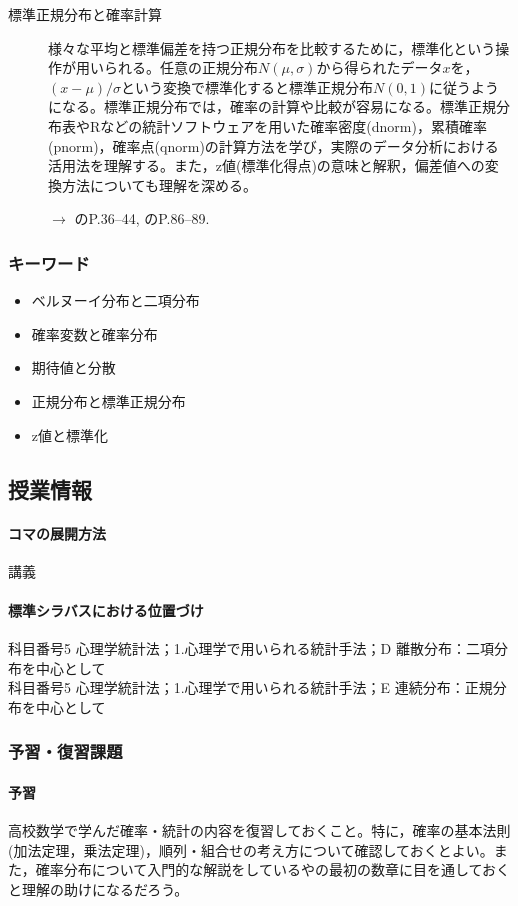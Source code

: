 \begin{description}
	\item[標準正規分布と確率計算] 様々な平均と標準偏差を持つ正規分布を比較するために，標準化という操作が用いられる。任意の正規分布$N(\mu,\sigma)$から得られたデータ$x$を，$(x-\mu)/\sigma$という変換で標準化すると標準正規分布$N(0,1)$に従うようになる。標準正規分布では，確率の計算や比較が容易になる。標準正規分布表やRなどの統計ソフトウェアを用いた確率密度(dnorm)，累積確率(pnorm)，確率点(qnorm)の計算方法を学び，実際のデータ分析における活用法を理解する。また，z値(標準化得点)の意味と解釈，偏差値への変換方法についても理解を深める。
	      \begin{flushright}
		      $\to$ \textcite{Kawabata201408}のP.36--44, \textcite{Yamada2004}のP.86--89.
	      \end{flushright}
\end{description}

\subsubsection{キーワード}
\begin{itemize}
	\item ベルヌーイ分布と二項分布
	\item 確率変数と確率分布
	\item 期待値と分散
	\item 正規分布と標準正規分布
	\item z値と標準化
\end{itemize}

\subsection{授業情報}
\paragraph{コマの展開方法}
講義
\paragraph{標準シラバスにおける位置づけ}
科目番号5 心理学統計法；1.心理学で用いられる統計手法；D 離散分布：二項分布を中心として\\
科目番号5 心理学統計法；1.心理学で用いられる統計手法；E 連続分布：正規分布を中心として

\subsubsection{予習・復習課題}
\paragraph{予習}
高校数学で学んだ確率・統計の内容を復習しておくこと。特に，確率の基本法則(加法定理，乗法定理)，順列・組合せの考え方について確認しておくとよい。また，確率分布について入門的な解説をしている\textcite{Hamada201812}や\textcite{Maeda2017}の最初の数章に目を通しておくと理解の助けになるだろう。
